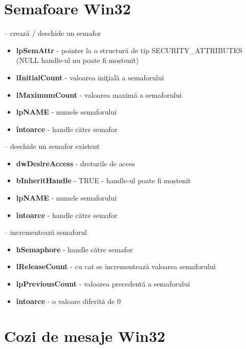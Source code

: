 \documentclass{refcard.cs.pub.ro}
\begin{document}
\begin{multicols*}{3}
\vspace*{-0.3cm}
\section{ Semafoare Win32}

 -- crează / deschide un semafor
\begin{itemize}
  \item \textbf{lpSemAttr} - pointer la o structură de tip SECURITY_ATTRIBUTES (NULL handle-ul nu poate fi moștenit)
  \item \textbf{lInitialCount} - valoarea iniţială a semaforului
  \item \textbf{lMaximumCount} - valoarea maximă a semaforului
  \item \textbf{lpNAME} - numele semaforului
  \item \textbf{întoarce} - handle către semafor
\end{itemize}

 -- deschide un semafor existent
\begin{itemize}
  \item \textbf{dwDesireAccess} - dreturile de acces
  \item \textbf{bInheritHandle} - TRUE - handle-ul poate fi moștenit
  \item \textbf{lpNAME} - numele semaforului
  \item \textbf{întoarce} - handle către semafor
\end{itemize}

 -- incrementează semaforul
\begin{itemize}
  \item \textbf{hSemaphore} - handle către semafor
  \item \textbf{lReleaseCount} - cu cat se incrementează valoarea semaforului
  \item \textbf{lpPreviousCount} - valoarea precedentă a semaforului
  \item \textbf{întoarce} - o valoare diferită de 0
\end{itemize}

\vspace*{-0.3cm}
\section{ Cozi de mesaje Win32}


\end{multicols*}
\end{document}
